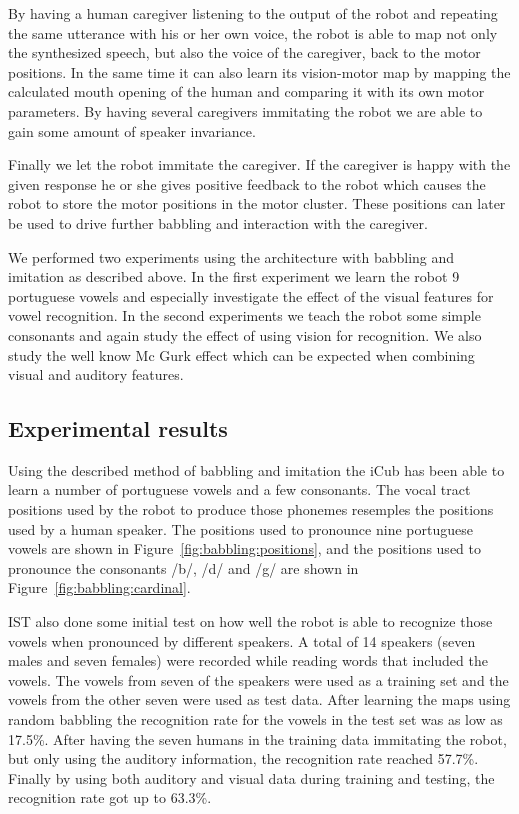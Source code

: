 By having a human caregiver listening to the output of the robot and
repeating the same utterance with his or her own voice, the robot is
able to map not only the synthesized speech, but also the voice of the
caregiver, back to the motor positions. In the same time it can also
learn its vision-motor map by mapping the calculated mouth opening of
the human and comparing it with its own motor parameters. By having
several caregivers immitating the robot we are able to gain some
amount of speaker invariance.

Finally we let the robot immitate the caregiver. If the caregiver is
happy with the given response he or she gives positive feedback to the
robot which causes the robot to store the motor positions in the motor
cluster. These positions can later be used to drive further babbling
and interaction with the caregiver.

We performed two experiments using the architecture with babbling and
imitation as described above. In the first experiment we learn the
robot 9 portuguese vowels and especially investigate the effect of the
visual features for vowel recognition. In the second experiments we
teach the robot some simple consonants and again study the effect of
using vision for recognition. We also study the well know Mc Gurk
effect which can be expected when combining visual and auditory
features.

\subsection{Experimental results}
Using the described method of babbling and imitation the iCub has been
able to learn a number of portuguese vowels and a few consonants. The
vocal tract positions used by the robot to produce those phonemes
resemples the positions used by a human speaker. The positions used to
pronounce nine portuguese vowels are shown in Figure~\ref{fig:babbling:positions}, and the
positions used to pronounce the consonants /b/, /d/ and /g/ are shown
in Figure~\ref{fig:babbling:cardinal}.

IST also done some initial test on how well the robot is able to
recognize those vowels when pronounced by different speakers. A total
of 14 speakers (seven males and seven females) were recorded while
reading words that included the vowels. The vowels from seven of the
speakers were used as a training set and the vowels from the other
seven were used as test data. After learning the maps using random
babbling the recognition rate for the vowels in the test set was as
low as 17.5\%. After having the seven humans in the training data
immitating the robot, but only using the auditory information, the
recognition rate reached 57.7\%. Finally by using both auditory and
visual data during training and testing, the recognition rate got up
to 63.3\%.

